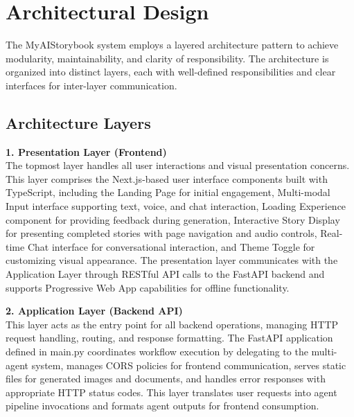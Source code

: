 \section{Architectural Design}
The MyAIStorybook system employs a layered architecture pattern to achieve modularity, maintainability, and clarity of responsibility. The architecture is organized into distinct layers, each with well-defined responsibilities and clear interfaces for inter-layer communication.

\subsection{Architecture Layers}

\textbf{1. Presentation Layer (Frontend)}\\
The topmost layer handles all user interactions and visual presentation concerns. This layer comprises the Next.js-based user interface components built with TypeScript, including the Landing Page for initial engagement, Multi-modal Input interface supporting text, voice, and chat interaction, Loading Experience component for providing feedback during generation, Interactive Story Display for presenting completed stories with page navigation and audio controls, Real-time Chat interface for conversational interaction, and Theme Toggle for customizing visual appearance. The presentation layer communicates with the Application Layer through RESTful API calls to the FastAPI backend and supports Progressive Web App capabilities for offline functionality.

\textbf{2. Application Layer (Backend API)}\\
This layer acts as the entry point for all backend operations, managing HTTP request handling, routing, and response formatting. The FastAPI application defined in main.py coordinates workflow execution by delegating to the multi-agent system, manages CORS policies for frontend communication, serves static files for generated images and documents, and handles error responses with appropriate HTTP status codes. This layer translates user requests into agent pipeline invocations and formats agent outputs for frontend consumption.

